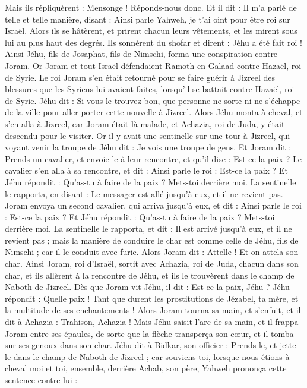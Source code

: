 \begin{multicols}{2}
Mais ils répliquèrent : Mensonge ! Réponds-nous donc. Et il dit : Il m’a parlé de telle et telle manière, disant : Ainsi parle Yahweh, je t’ai oint pour être roi sur Israël.
Alors ils se hâtèrent, et prirent chacun leurs vêtements, et les mirent sous lui au plus haut des degrés. Ils sonnèrent du shofar et dirent : Jéhu a été fait roi !
Ainsi Jéhu, fils de Josaphat, fils de Nimschi, forma une conspiration contre Joram. Or Joram et tout Israël défendaient Ramoth en Galaad contre Hazaël, roi de Syrie.
Le roi Joram s’en était retourné pour se faire guérir à Jizreel des blessures que les Syriens lui avaient faites, lorsqu’il se battait contre Hazaël, roi de Syrie. Jéhu dit : Si vous le trouvez bon, que personne ne sorte ni ne s’échappe de la ville pour aller porter cette nouvelle à Jizreel.
Alors Jéhu monta à cheval, et s’en alla à Jizreel, car Joram était là malade, et Achazia, roi de Juda, y était descendu pour le visiter.
Or il y avait une sentinelle sur une tour à Jizreel, qui voyant venir la troupe de Jéhu dit : Je vois une troupe de gens. Et Joram dit : Prends un cavalier, et envoie-le à leur rencontre, et qu’il dise : Est-ce la paix ?
Le cavalier s’en alla à sa rencontre, et dit : Ainsi parle le roi : Est-ce la paix ? Et Jéhu répondit : Qu’as-tu à faire de la paix ? Mets-toi derrière moi. La sentinelle le rapporta, en disant : Le messager est allé jusqu’à eux, et il ne revient pas.
Joram envoya un second cavalier, qui arriva jusqu’à eux, et dit : Ainsi parle le roi : Est-ce la paix ? Et Jéhu répondit : Qu’as-tu à faire de la paix ? Mets-toi derrière moi.
La sentinelle le rapporta, et dit : Il est arrivé jusqu’à eux, et il ne revient pas ; mais la manière de conduire le char est comme celle de Jéhu, fils de Nimschi ; car il le conduit avec furie.
Alors Joram dit : Attelle ! Et on attela son char. Ainsi Joram, roi d’Israël, sortit avec Achazia, roi de Juda, chacun dans son char, et ils allèrent à la rencontre de Jéhu, et ils le trouvèrent dans le champ de Naboth de Jizreel.
Dès que Joram vit Jéhu, il dit : Est-ce la paix, Jéhu ? Jéhu répondit : Quelle paix ! Tant que durent les prostitutions de Jézabel, ta mère, et la multitude de ses enchantements !
Alors Joram tourna sa main, et s’enfuit, et il dit à Achazia : Trahison, Achazia !
Mais Jéhu saisit l’arc de sa main, et il frappa Joram entre ses épaules, de sorte que la flèche transperça son cœur, et il tomba sur ses genoux dans son char.
Jéhu dit à Bidkar, son officier : Prends-le, et jette-le dans le champ de Naboth de Jizreel ; car souviens-toi, lorsque nous étions à cheval moi et toi, ensemble, derrière Achab, son père, Yahweh prononça cette sentence contre lui :

\end{multicols}
